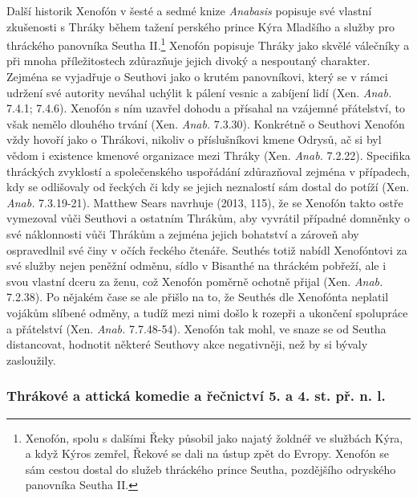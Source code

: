 Další historik Xenofón v šesté a sedmé knize {\em Anabasis} popisuje své vlastní zkušenosti s Thráky během tažení perského prince Kýra Mladšího a služby pro thráckého panovníka Seutha II.\footnote{Xenofón, spolu s dalšími Řeky působil jako najatý žoldnéř ve službách Kýra, a když Kýros zemřel, Řekové se dali na ústup zpět do Evropy. Xenofón se sám cestou dostal do služeb thráckého prince Seutha, pozdějšího odryského panovníka Seutha II.} Xenofón popisuje Thráky jako skvělé válečníky a při mnoha příležitostech zdůrazňuje jejich divoký a nespoutaný charakter. Zejména se vyjadřuje o Seuthovi jako o krutém panovníkovi, který se v rámci udržení své autority neváhal uchýlit k pálení vesnic a zabíjení lidí (Xen. {\em Anab.} 7.4.1; 7.4.6). Xenofón s ním uzavřel dohodu a přísahal na vzájemné přátelství, to však nemělo dlouhého trvání (Xen. {\em Anab.} 7.3.30). Konkrétně o Seuthovi Xenofón vždy hovoří jako o Thrákovi, nikoliv o příslušníkovi kmene Odrysů, ač si byl vědom i existence kmenové organizace mezi Thráky (Xen. {\em Anab.} 7.2.22). Specifika thráckých zvyklostí a společenského uspořádání zdůrazňoval zejména v případech, kdy se odlišovaly od řeckých či kdy se jejich neznalostí sám dostal do potíží (Xen. {\em Anab.} 7.3.19-21). Matthew Sears navrhuje (2013, 115), že se Xenofón takto ostře vymezoval vůči Seuthovi a ostatním Thrákům, aby vyvrátil případné domněnky o své náklonnosti vůči Thrákům a zejména jejich bohatství a zároveň aby ospravedlnil své činy v očích řeckého čtenáře. Seuthés totiž nabídl Xenofóntovi za své služby nejen peněžní odměnu, sídlo v Bisanthé na thráckém pobřeží, ale i svou vlastní dceru za ženu, což Xenofón poměrně ochotně přijal (Xen. {\em Anab.} 7.2.38). Po nějakém čase se ale přišlo na to, že Seuthés dle Xenofónta neplatil vojákům slíbené odměny, a tudíž mezi nimi došlo k rozepři a ukončení spolupráce a přátelství (Xen. {\em Anab.} 7.7.48-54). Xenofón tak mohl, ve snaze se od Seutha distancovat, hodnotit některé Seuthovy akce negativněji, než by si bývaly zasloužily.

\subsubsection[thrákové-a-attická-komedie-a-řečnictví-5.-a-4.-st.-př.-n.-l.]{Thrákové a attická komedie a řečnictví 5. a 4. st. př. n. l.}

